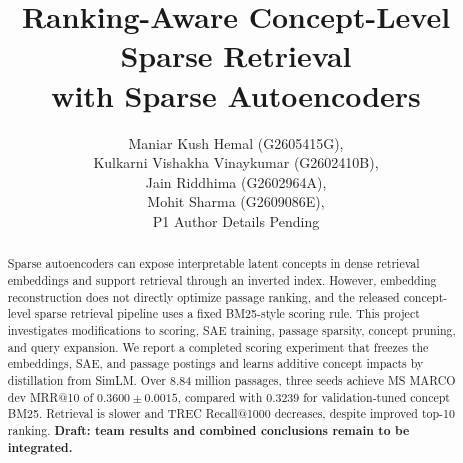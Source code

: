 \documentclass[letterpaper]{article}
\title{Ranking-Aware Concept-Level Sparse Retrieval\\with Sparse Autoencoders}
\author{
Maniar Kush Hemal (G2605415G),\\
Kulkarni Vishakha Vinaykumar (G2602410B),\\
Jain Riddhima (G2602964A),\\
Mohit Sharma (G2609086E),\\
P1 Author Details Pending
}
\begin{document}
\maketitle
\begin{abstract}
Sparse autoencoders can expose interpretable latent concepts in dense retrieval
embeddings and support retrieval through an inverted index. However, embedding
reconstruction does not directly optimize passage ranking, and the released
concept-level sparse retrieval pipeline uses a fixed BM25-style scoring rule.
This project investigates modifications to scoring, SAE training, passage
sparsity, concept pruning, and query expansion. We report a completed scoring
experiment that freezes the embeddings, SAE, and passage postings and learns
additive concept impacts by distillation from SimLM. Over 8.84 million passages,
three seeds achieve MS MARCO dev MRR@10 of $0.3600\pm0.0015$, compared with
$0.3239$ for validation-tuned concept BM25. Retrieval is slower and TREC
Recall@1000 decreases, despite improved top-10 ranking.
\textbf{Draft: team results and combined conclusions remain to be integrated.}
\end{abstract}








\end{document}
